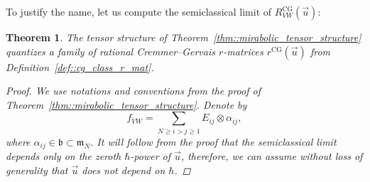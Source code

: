 \documentclass[10pt,a4paper]{article}
\numberwithin{equation}{section}
\newtheorem{Theorem}{Theorem}[section]
\newcommand{\CG}{\mathrm{CG}}
\renewcommand{\b}{\mathfrak{b}}
\newcommand{\m}{\mathfrak{m}}
\begin{document}
	To justify the name, let us compute the semiclassical limit of $R_{VW}^{\CG}(\vec{u})$:
	\begin{Theorem}
		\label{eq::cg_quantization}
		The tensor structure of Theorem~{\rm\ref{thm::mirabolic_tensor_structure}} quantizes a family of rational Cremmer--Gervais $r$-matrices $r^{\CG}(\vec{u})$ from Definition~{\rm\ref{def::cg_class_r_mat}}.
		\begin{proof}
			We use notations and conventions from the proof of Theorem~\ref{thm::mirabolic_tensor_structure}. Denote by
			\[
			f_{VW} = \sum\limits_{N \geq i > j \geq 1} E_{ij} \otimes \alpha_{ij},
			\]
			where $\alpha_{ij} \in \b \subset \m_N$. It will follow from the proof that the semiclassical limit depends only on the zeroth $\hbar$-power of $\vec{u}$, therefore, we can assume without loss of generality that $\vec{u}$ does not depend on $\hbar$.
			

\end{proof}
\end{Theorem}
\end{document}
